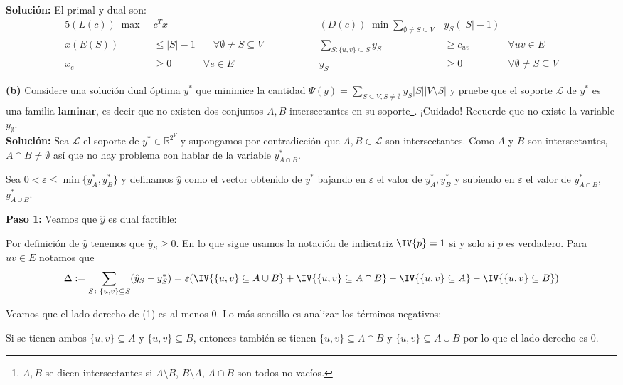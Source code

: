 \documentclass[10pt]{article}
\newcommand{\RR}{\mathbb R}
\theoremstyle{plain}
\theoremstyle{definition}
\begin{document}
\textbf{Solución:}
El primal y dual son:
\begin{alignat*}{5}
(L(c))\;\max\; & c^T x & \qquad \qquad& &(D(c))\;\min \sum_{\emptyset\neq S\subseteq V}&y_S(|S|-1)\\
x(E(S))&\leq |S|-1 &\quad \forall \emptyset\neq S\subseteq V&\qquad\qquad &\sum_{S\colon \{u,v\}\subseteq S} y_S&\geq c_{uv} &\forall uv\in E\\
x_e&\geq 0 &\forall e\in E & &y_S&\geq 0& \forall \emptyset\neq S\subseteq V
\end{alignat*}


\hspace{-15pt}\textbf{(b)} Considere una solución dual óptima $y^*$ que minimice la cantidad $\Psi(y)=\sum_{S\subseteq V, S\neq \emptyset} y_S |S||V\setminus S|$
y pruebe que el soporte $\mathcal{L}$ de $y^*$ es una familia \textbf{laminar}, es decir que no existen dos conjuntos $A, B$ intersectantes en su soporte\footnote{$A, B$ se dicen intersectantes si $A\setminus B$, $B\setminus A$, $A\cap B$ son todos no vacíos.}. ¡Cuidado! Recuerde que no existe la variable $y_\emptyset$.\\

\textbf{Solución:}
Sea $\mathcal{L}$ el soporte de $y^*\in \RR^{2^V}$ y supongamos por contradicción que $A, B\in \mathcal{L}$ son intersectantes. Como $A$ y $B$ son intersectantes, $A\cap B\neq \emptyset$ así que no hay problema con hablar de la variable $y^*_{A\cap B}$.

Sea $0<\varepsilon\leq \min\{y^{*}_{A},y^{*}_{B}\}$ y definamos $\hat{y}$ como el vector obtenido de $y^*$ bajando en $\varepsilon$ el valor de $y^*_A, y^*_B$ y subiendo en $\varepsilon$ el valor de $y^*_{A\cap B}$, $y^*_{A\cup B}$.

\textbf{Paso 1:} Veamos que $\hat{y}$ es dual factible:

Por definición de $\hat{y}$ tenemos que $\hat{y}_S\geq 0$.
En lo que sigue usamos la notación de indicatriz $\IV{p}=1$ si y solo si $p$ es verdadero.
Para $uv\in E$ notamos que 
\begin{align}
\Delta:=\sum_{S\colon \{u,v\}\subseteq S} (\hat{y}_S  - y^*_S) = \varepsilon ( \IV{\{u, v\} \subseteq A\cup B} + \IV{\{u,v\} \subseteq  A\cap B}- \IV{\{u,v\}\subseteq A} - \IV{\{u,v\}\subseteq B})
\end{align}

Veamos que el lado derecho de (1) es al menos 0. Lo más sencillo es analizar los términos negativos: 

Si se tienen ambos $\{u,v\}\subseteq A$ y $\{u,v\}\subseteq B$, entonces también se tienen 
$\{u,v\}\subseteq A\cap B$ y $\{u,v\}\subseteq A\cup B$ por lo que el lado derecho es 0.
\end{document}
